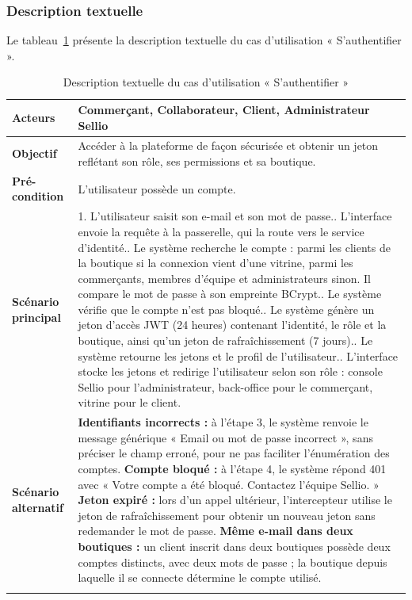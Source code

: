 \subsubsection{Description textuelle}
Le tableau~\ref{tab:uc-login} présente la description textuelle du cas d'utilisation « S'authentifier ».
\renewcommand{\arraystretch}{1.5}
\begin{longtable}{|p{4cm}|p{11cm}|}
\hline
\textbf{Acteurs} & Commerçant, Collaborateur, Client, Administrateur Sellio \\
\hline
\textbf{Objectif} & Accéder à la plateforme de façon sécurisée et obtenir un jeton reflétant son rôle, ses permissions et sa boutique. \\
\hline
\textbf{Pré-condition} & L'utilisateur possède un compte. \\
\hline
\textbf{Scénario principal} &
1. L'utilisateur saisit son e-mail et son mot de passe.\newline
2. L'interface envoie la requête à la passerelle, qui la route vers le service d'identité.\newline
3. Le système recherche le compte : parmi les clients de la boutique si la connexion vient d'une vitrine, parmi les commerçants, membres d'équipe et administrateurs sinon. Il compare le mot de passe à son empreinte BCrypt.\newline
4. Le système vérifie que le compte n'est pas bloqué.\newline
5. Le système génère un jeton d'accès JWT (24 heures) contenant l'identité, le rôle et la boutique, ainsi qu'un jeton de rafraîchissement (7 jours).\newline
6. Le système retourne les jetons et le profil de l'utilisateur.\newline
7. L'interface stocke les jetons et redirige l'utilisateur selon son rôle : console Sellio pour l'administrateur, back-office pour le commerçant, vitrine pour le client. \\
\hline
\textbf{Scénario alternatif} &
\textbf{Identifiants incorrects :} à l'étape 3, le système renvoie le message générique « Email ou mot de passe incorrect », sans préciser le champ erroné, pour ne pas faciliter l'énumération des comptes.\newline
\textbf{Compte bloqué :} à l'étape 4, le système répond 401 avec « Votre compte a été bloqué. Contactez l'équipe Sellio. »\newline
\textbf{Jeton expiré :} lors d'un appel ultérieur, l'intercepteur utilise le jeton de rafraîchissement pour obtenir un nouveau jeton sans redemander le mot de passe.\newline
\textbf{Même e-mail dans deux boutiques :} un client inscrit dans deux boutiques possède deux comptes distincts, avec deux mots de passe ; la boutique depuis laquelle il se connecte détermine le compte utilisé. \\
\hline
\caption{Description textuelle du cas d'utilisation « S'authentifier »}
\label{tab:uc-login}
\end{longtable}

